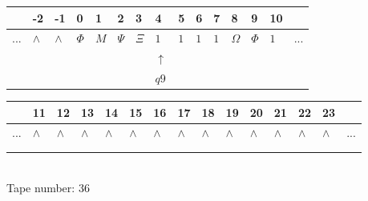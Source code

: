 \documentclass[11pt]{article}
\begin{document}
\begin{table}[H]
\centering
\begin{tabular}{lllllllllllllll}
 & -2 & -1 & 0 & 1 & 2 & 3 & 4 & 5 & 6 & 7 & 8 & 9 & 10 & \\
\hline
$...$ & \multicolumn{1}{|l|}{$\wedge$} & \multicolumn{1}{|l|}{$\wedge$} & \multicolumn{1}{|l|}{$\Phi$} & \multicolumn{1}{|l|}{$M$} & \multicolumn{1}{|l|}{$\Psi$} & \multicolumn{1}{|l|}{$\Xi$} & \multicolumn{1}{|l|}{$1$} & \multicolumn{1}{|l|}{$1$} & \multicolumn{1}{|l|}{$1$} & \multicolumn{1}{|l|}{$1$} & \multicolumn{1}{|l|}{$\Omega$} & \multicolumn{1}{|l|}{$\Phi$} & \multicolumn{1}{|l|}{$1$} & $...$\\
\hline
&  &  &  &  &  &  & $\uparrow$ &  &  &  &  &  &  &  \\
&  &  &  &  &  &  & $ q9 $ &  &  &  &  &  &  &  \\
\end{tabular}
\begin{tabular}{lllllllllllllll}
 & 11 & 12 & 13 & 14 & 15 & 16 & 17 & 18 & 19 & 20 & 21 & 22 & 23 & \\
\hline
$...$ & \multicolumn{1}{|l|}{$\wedge$} & \multicolumn{1}{|l|}{$\wedge$} & \multicolumn{1}{|l|}{$\wedge$} & \multicolumn{1}{|l|}{$\wedge$} & \multicolumn{1}{|l|}{$\wedge$} & \multicolumn{1}{|l|}{$\wedge$} & \multicolumn{1}{|l|}{$\wedge$} & \multicolumn{1}{|l|}{$\wedge$} & \multicolumn{1}{|l|}{$\wedge$} & \multicolumn{1}{|l|}{$\wedge$} & \multicolumn{1}{|l|}{$\wedge$} & \multicolumn{1}{|l|}{$\wedge$} & \multicolumn{1}{|l|}{$\wedge$} & $...$\\
\hline
&  &  &  &  &  &  &  &  &  &  &  &  &  &  \\
&  &  &  &  &  &  &  &  &  &  &  &  &  &  \\
\end{tabular}
\\
Tape number: 36
\noindent\makebox[\linewidth]{\hdashrule{\textwidth}{1pt}{1pt}}\end{table}
\end{document}
